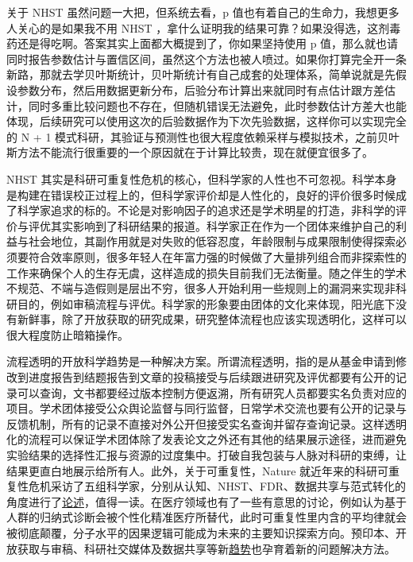 \documentclass[]{tufte-book}
\begin{document}
关于 NHST 虽然问题一大把，但系统去看，p 值也有着自己的生命力，我想更多人关心的是如果我不用 NHST ，拿什么证明我的结果可靠？如果没得选，这剂毒药还是得吃啊。答案其实上面都大概提到了，你如果坚持使用 p 值，那么就也请同时报告参数估计与置信区间，虽然这个方法也被人喷过。如果你打算完全开一条新路，那就去学贝叶斯统计，贝叶斯统计有自己成套的处理体系，简单说就是先假设参数分布，然后用数据更新分布，后验分布计算出来就同时有点估计跟方差估计，同时多重比较问题也不存在，但随机错误无法避免，此时参数估计方差大也能体现，后续研究可以使用这次的后验数据作为下次先验数据，这样你可以实现完全的 N + 1 模式科研，其验证与预测性也很大程度依赖采样与模拟技术，之前贝叶斯方法不能流行很重要的一个原因就在于计算比较贵，现在就便宜很多了。

NHST 其实是科研可重复性危机的核心，但科学家的人性也不可忽视。科学本身是构建在错误校正过程上的，但科学家评价却是人性化的，良好的评价很多时候成了科学家追求的标的。不论是对影响因子的追求还是学术明星的打造，非科学的评价与评优其实影响到了科研结果的报道。科学家正在作为一个团体来维护自己的利益与社会地位，其副作用就是对失败的低容忍度，年龄限制与成果限制使得探索必须要符合效率原则，很多年轻人在年富力强的时候做了大量排列组合而非探索性的工作来确保个人的生存无虞，这样造成的损失目前我们无法衡量。随之伴生的学术不规范、不端与造假则是层出不穷，很多人开始利用一些规则上的漏洞来实现非科研目的，例如审稿流程与评优。科学家的形象要由团体的文化来体现，阳光底下没有新鲜事，除了开放获取的研究成果，研究整体流程也应该实现透明化，这样可以很大程度防止暗箱操作。

流程透明的开放科学趋势是一种解决方案。所谓流程透明，指的是从基金申请到修改到进度报告到结题报告到文章的投稿接受与后续跟进研究及评优都要有公开的记录可以查询，文书都要经过版本控制方便返溯，所有研究人员都要实名负责对应的项目。学术团体接受公众舆论监督与同行监督，日常学术交流也要有公开的记录与反馈机制，所有的记录不直接对外公开但接受实名查询并留存查询记录。这样透明化的流程可以保证学术团体除了发表论文之外还有其他的结果展示途径，进而避免实验结果的选择性汇报与资源的过度集中。打破自我包装与人脉对科研的束缚，让结果更直白地展示给所有人。此外，关于可重复性，Nature 就近年来的科研可重复性危机采访了五组科学家，分别从认知、NHST、FDR、数据共享与范式转化的角度进行了\href{https://www.nature.com/articles/d41586-017-07522-z}{论述}，值得一读。在医疗领域也有了一些有意思的讨论，例如认为基于人群的归纳式诊断会被个性化精准医疗所替代，此时可重复性里内含的平均律就会被彻底颠覆，分子水平的因果逻辑可能成为未来的主要知识探索方向。预印本、开放获取与审稿、科研社交媒体及数据共享等新\href{https://theoreticalecology.wordpress.com/2019/01/22/tree-species-richness-and-its-effects-on-productivity-neither-global-nor-consistent/}{趋势}也孕育着新的问题解决方法。
\end{document}
